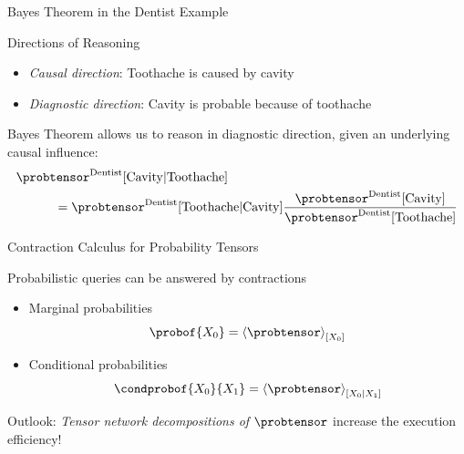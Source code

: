 \documentclass{beamer}
\begin{document}
    \begin{frame}{Bayes Theorem in the Dentist Example}

        Directions of Reasoning
        \begin{itemize}
            \item \emph{Causal direction}: Toothache is caused by cavity
            \item \emph{Diagnostic direction}: Cavity is probable because of toothache
        \end{itemize}

        \medskip

        Bayes Theorem allows us to reason in diagnostic direction, given an underlying causal influence:
        \begin{align*}
            & \probtensor^{\mathrm{Dentist}}[\mathrm{Cavity}|\mathrm{Toothache}] \\
            & \quad\quad\quad =
            \probtensor^{\mathrm{Dentist}}[\mathrm{Toothache}|\mathrm{Cavity}]
            \frac{\probtensor^{\mathrm{Dentist}}[\mathrm{Cavity}] }{\probtensor^{\mathrm{Dentist}}[\mathrm{Toothache}]}
        \end{align*}

    \end{frame}





    \begin{frame}{Contraction Calculus for Probability Tensors}

        Probabilistic queries can be answered by contractions
        \begin{itemize}
            \item Marginal probabilities
            \[ \probof{\exrandom} = \contractionof{\probtensor}{\exrandom} \]
            \item Conditional probabilities
            \[ \condprobof{\exrandom}{\secexrandom} = \normalizationofwrt{\probtensor}{\exrandom}{\secexrandom} \]
        \end{itemize}

        \medskip

        Outlook: \emph{Tensor network decompositions of $\probtensor$} increase the execution efficiency!

    \end{frame}
\end{document}
